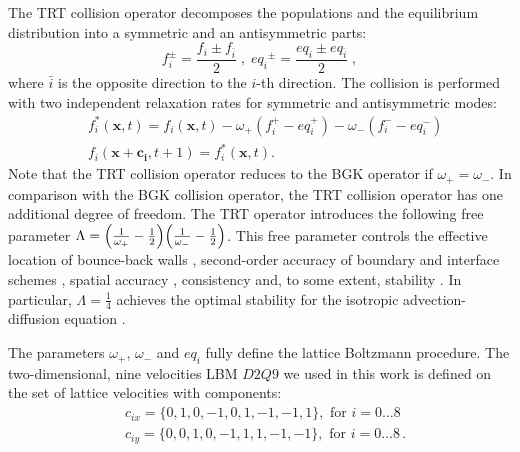 \documentclass{article}
\newcommand{\beqal}{\begin{equation}\begin{aligned}}
\newcommand{\feqal}{\end{aligned}\end{equation}}
\newcommand{\omegaplus}{\omega_{+}}
\newcommand{\omegaminus}{\omega_{-}}
\begin{document}
The TRT collision operator \cite{ginzburg-boundary-main}
decomposes the populations and the equilibrium
distribution into a symmetric and an antisymmetric parts:
\begin{equation}
\label{trtdecomp}
f^{\pm}_i=\frac{f_i\pm f_{\bar{i}}}{2}\;,\; 
{eq_i}^{\pm}=\frac{eq_i\pm eq_{\bar{i}}}{2}\;,
\end{equation}
where $\bar{i}$ is the opposite direction to the $i$-th direction.
The collision is performed with two independent relaxation rates for 
symmetric and antisymmetric modes:
\begin{equation}
\label{trt}
\begin{aligned}
&f_i^{*}(\bm{x},t)=f_i(\bm{x},t)-\omegaplus (f_i^{+} - eq_i^+)-\omegaminus
(f_i^{-} -
eq_i^-)\\
&f_i(\bm{x}+\bm{c_i},t+1)=f_i^{*}(\bm{x},t).
\end{aligned}
\end{equation}
Note that the TRT collision operator reduces to the BGK operator if
$\omegaplus=\omegaminus$. In comparison with the BGK collision operator,
the TRT collision operator has one additional degree of freedom. The TRT operator 
introduces
the following free parameter
$\Lambda=\Bigl(\frac{1}{\omegaplus}-\frac{1}{2}\Bigr)\Bigl(\frac{1}{\omegaminus}-\frac{1}{2}
\Bigr)$. 
This free parameter controls the effective location of  bounce-back
walls \cite{ginzburg-multireflection}, second-order accuracy of
boundary \cite{ginzburg-boundary-main} and interface schemes \cite{ginzburg-discontinious}, 
spatial accuracy \cite{ginzburg-recurrence,servan-trt-stability},
consistency \cite{ginzburg-brinkman} and, to some extent,
stability \cite{kuzmin-stability-optimal,kuzmin-d1q3,servan-trt-stability}.
In particular, $\Lambda=\frac{1}{4}$ achieves the optimal stability for the
isotropic advection-diffusion equation \cite{kuzmin-stability-optimal}. 

The parameters $\omegaplus$, $\omegaminus$ and $eq_i$ fully define the lattice Boltzmann
procedure. The two-dimensional, nine velocities LBM $D2Q9$ we used in this work is defined on the set
of lattice
velocities with components:
\beqal
&c_{ix}=\{0,1,0,-1,0,1,-1,-1,1\},\text{ for } i=0\dots8\\
&c_{iy}=\{0,0,1,0,-1,1,1,-1,-1\},\text{ for } i=0\dots8\,.
\feqal
\end{document}
